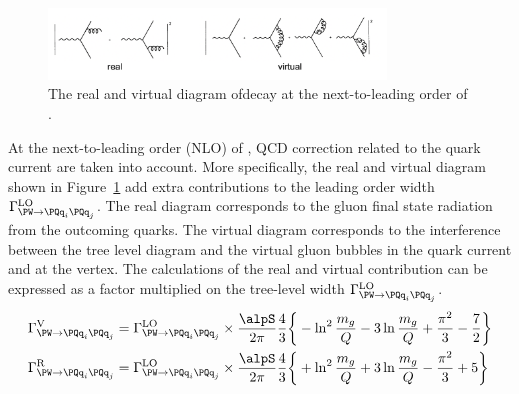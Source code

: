 
\begin{figure}
    \centering
    \includegraphics[width=0.8\textwidth]{chapters/RelatedWorks/sectionVcs/figures/realVirtual.png}
    \caption{ The real and virtual diagram of\PW decay at the next-to-leading order of \alpS. }
    \label{fig:relatedWorks:vcs:realVirtual}
\end{figure}


\noindent At the next-to-leading order (NLO) of \alpS, QCD correction related to the quark current are taken into account. More specifically, the real and virtual diagram shown in Figure~\ref{fig:relatedWorks:vcs:realVirtual} add extra contributions to the leading order width $\Gamma_{\PW \to \PQq_i \PQq_j}^{\rm LO} $. The real diagram corresponds to the gluon final state radiation from the outcoming quarks. The virtual diagram corresponds to the interference between the tree level diagram and the virtual gluon bubbles in the quark current and at the vertex. The calculations of the real and virtual contribution can be expressed as a factor multiplied on the tree-level width  $\Gamma_{\PW \to \PQq_i \PQq_j}^{\rm LO} $.
 \begin{align}
 	\Gamma^{\rm V}_{\PW \to \PQq_i \PQq_j}  &= \Gamma_{\PW \to \PQq_i \PQq_j}^{\rm LO} \times \frac{\alpS}{2\pi}\frac{4}{3} \bigg \{  -\ln^2\frac{m_g}{Q} -3 \ln\frac{m_g}{Q} + \frac{\pi^2}{3}-\frac{7}{2} \bigg\} \\
    \Gamma^{\rm R}_{\PW \to \PQq_i \PQq_j}  &= \Gamma_{\PW \to \PQq_i \PQq_j}^{\rm LO} \times \frac{\alpS}{2\pi}\frac{4}{3} \bigg \{  +\ln^2\frac{m_g}{Q} + 3 \ln\frac{m_g}{Q} - \frac{\pi^2}{3}+ 5 \bigg\}
\end{align}
 

